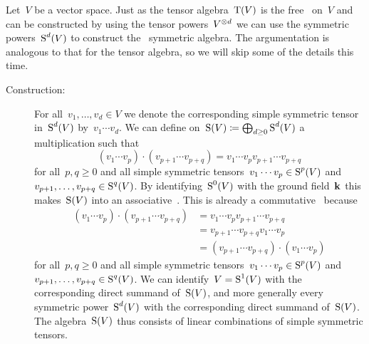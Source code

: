 \begin{recall}
  Let~$V$ be a vector space.
  Just as the tensor algebra~$\operatorname{T}(V)$ is the free~{\algebra{$\kf$}} on~$V$ and can be constructed by using the tensor powers~$V^{\otimes d}$ we can use the symmetric powers~$\operatorname{S}^d(V)$ to construct the ~\gls*{symmetric algebra}.
  The argumentation is analogous to that for the tensor algebra, so we will skip some of the details this time.
  
  \begin{description}
    \item[Construction:]
      For all~$v_1, \dotsc, v_d \in V$ we denote the corresponding simple symmetric tensor in~$\operatorname{S}^d(V)$ by~$v_1 \dotsm v_d$.
      We can define on~$\operatorname{S}(V) \coloneqq \bigoplus_{d \geq 0} \operatorname{S}^d(V)$ a multiplication such that
      \[
        (v_1 \dotsm v_p) \cdot (v_{p+1} \dotsm v_{p+q})
        =
        v_1 \dotsm v_p v_{p+1} \dotsm v_{p+q}
      \]
      for all~$p, q \geq 0$ and all simple symmetric tensors~$v_1 \dotsm v_p \in \operatorname{S}^p(V)$ and~$v_{p+1}, \dotsc, v_{p+q} \in \operatorname{S}^q(V)$.
      By identifying~$\operatorname{S}^0(V)$ with the ground field~$\kf$ this makes~$\operatorname{S}(V)$ into an associative~{\algebra{$\kf$}}.
      This is already a commutative~{\algebra{$\kf$}} because
      \begin{align*}
        (v_1 \dotsm v_p) \cdot (v_{p+1} \dotsm v_{p+q})
        &=
        v_1 \dotsm v_p v_{p+1} \dotsm v_{p+q}
        \\
        &=
        v_{p+1} \dotsm v_{p+q} v_1 \dotsm v_p
        \\
        &=
        (v_{p+1} \dotsm v_{p+q}) \cdot (v_1 \dotsm v_p)
      \end{align*}
      for all~$p, q \geq 0$ and all simple symmetric tensors~$v_1 \dotsm v_p \in \operatorname{S}^p(V)$ and~$v_{p+1}, \dotsc, v_{p+q} \in \operatorname{S}^q(V)$. 
      We can identify~$V = \operatorname{S}^1(V)$ with the corresponding direct summand of~$\operatorname{S}(V)$, and more generally every symmetric power~$\operatorname{S}^d(V)$ with the corresponding direct summand of~$\operatorname{S}(V)$.
      The algebra~$\operatorname{S}(V)$ thus consists of linear combinations of simple symmetric tensors.
      

\end{description}
\end{recall}
